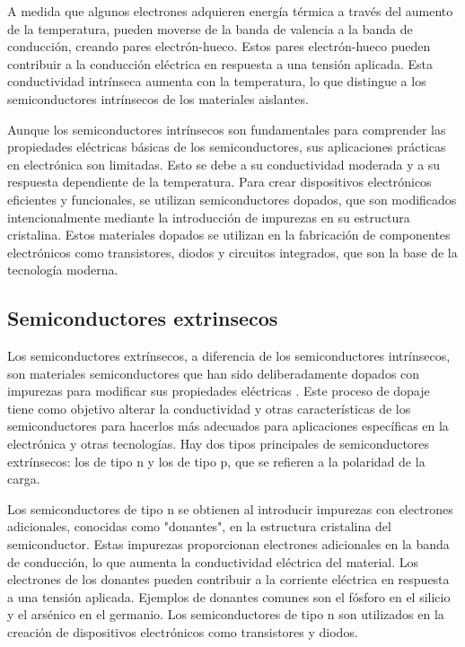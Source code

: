 \documentclass[10.5pt]{article}
\begin{document}
    A medida que algunos electrones adquieren energía térmica a través del aumento de la temperatura, pueden moverse de la banda de valencia a la banda de conducción, creando pares electrón-hueco. Estos pares electrón-hueco pueden contribuir a la conducción eléctrica en respuesta a una tensión aplicada. Esta conductividad intrínseca aumenta con la temperatura, lo que distingue a los semiconductores intrínsecos de los materiales aislantes.

    Aunque los semiconductores intrínsecos son fundamentales para comprender las propiedades eléctricas básicas de los semiconductores, sus aplicaciones prácticas en electrónica son limitadas. Esto se debe a su conductividad moderada y a su respuesta dependiente de la temperatura. Para crear dispositivos electrónicos eficientes y funcionales, se utilizan semiconductores dopados, que son modificados intencionalmente mediante la introducción de impurezas en su estructura cristalina. Estos materiales dopados se utilizan en la fabricación de componentes electrónicos como transistores, diodos y circuitos integrados, que son la base de la tecnología moderna.
    \subsection{Semiconductores extrinsecos}
    Los semiconductores extrínsecos, a diferencia de los semiconductores intrínsecos, son materiales semiconductores que han sido deliberadamente dopados con impurezas para modificar sus propiedades eléctricas \cite{candal}. Este proceso de dopaje tiene como objetivo alterar la conductividad y otras características de los semiconductores para hacerlos más adecuados para aplicaciones específicas en la electrónica y otras tecnologías. Hay dos tipos principales de semiconductores extrínsecos: los de tipo n y los de tipo p, que se refieren a la polaridad de la carga.

    Los semiconductores de tipo n se obtienen al introducir impurezas con electrones adicionales, conocidas como "donantes", en la estructura cristalina del semiconductor. Estas impurezas proporcionan electrones adicionales en la banda de conducción, lo que aumenta la conductividad eléctrica del material. Los electrones de los donantes pueden contribuir a la corriente eléctrica en respuesta a una tensión aplicada. Ejemplos de donantes comunes son el fósforo en el silicio y el arsénico en el germanio. Los semiconductores de tipo n son utilizados en la creación de dispositivos electrónicos como transistores y diodos.
\end{document}
